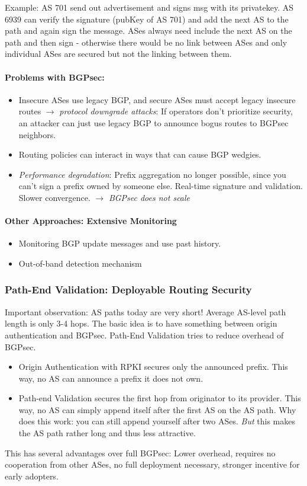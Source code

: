 Example: AS 701 send out advertisement and signs msg with its privatekey. AS 6939 can verify the signature (pubKey of AS 701) and add the next AS to the path and again sign the message. ASes always need include the next AS on the path and then sign - otherwise there would be no link between ASes and only individual ASes are secured but not the linking between them.

\paragraph{Problems with BGPsec:}
\begin{itemize}
	\item Insecure ASes use legacy BGP, and secure ASes must accept legacy insecure routes $\rightarrow$ \textit{protocol downgrade attacks}: If operators don’t prioritize security, an attacker can just use legacy BGP to announce bogus routes to BGPsec neighbors.
	\item Routing policies can interact in ways that can cause BGP wedgies.
	\item \textit{Performance degradation}: Prefix aggregation no longer possible, since you can't sign a prefix owned by someone else. Real-time signature and validation. Slower convergence.
	\subitem $\rightarrow$ \textit{BGPsec does not scale}
\end{itemize}

\paragraph{Other Approaches: Extensive Monitoring}
\begin{itemize}
    \item Monitoring BGP update messages and use past history.
    \item Out-of-band detection mechanism
\end{itemize}

\subsubsection{Path-End Validation: Deployable Routing Security}

Important observation: AS paths today are very short! Average AS-level path length is only 3-4 hops. The basic idea is to have something between origin authentication and BGPsec. Path-End Validation tries to reduce overhead of BGPsec.\\

\begin{itemize}
	\item Origin Authentication with RPKI secures only the announced prefix. This way, no AS can announce a prefix it does not own.
	\item Path-end Validation secures the first hop	from originator to its provider. This way, no AS can simply append itself after the first AS on the AS path. Why does this work: you can still append yourself after two ASes. \textit{But} this makes the AS path rather long and thus less attractive.
\end{itemize}

This has several advantages over full BGPsec: Lower overhead, requires no cooperation from other ASes, no full deployment necessary, stronger incentive for early adopters.
